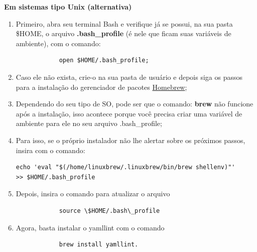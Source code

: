 \textbf{Em sistemas tipo Unix (alternativa)}

\begin{enumerate}
  \item Primeiro, abra seu terminal Bash e verifique já se possui, na sua pasta \$HOME, o arquivo \textbf{.bash\_profile} (é nele que ficam suas variáveis de ambiente), com o comando: 
    \lstset{language=Fortran,
             basicstyle=\ttfamily\small
    }
        \begin{lstlisting}
            open $HOME/.bash_profile; 
        \end{lstlisting}
  
  \item Caso ele não exista, crie-o na sua pasta de usuário e depois siga os passos para a instalação do gerenciador de pacotes \href{https://brew.sh/index_pt-br}{Homebrew};
  
  \item Dependendo do seu tipo de \acs{SO}, pode ser que o comando: \textbf{brew} não funcione após a instalação, isso acontece porque você precisa criar uma variável de ambiente para ele no seu arquivo .bash\_profile;
  
  \item Para isso, se o próprio instalador não lhe alertar sobre os próximos passos, insira com o comando:  
    \lstset{language=Fortran,
                 basicstyle=\ttfamily\small,
                 showstringspaces=false
        }
        \begin{lstlisting} 
echo 'eval "$(/home/linuxbrew/.linuxbrew/bin/brew shellenv)"'
>> $HOME/.bash_profile
        \end{lstlisting}
        
  \item Depois, insira o comando para atualizar o arquivo
    \lstset{language=Fortran,
             basicstyle=\ttfamily\small
    }
        \begin{lstlisting} 
            source \$HOME/.bash\_profile 
        \end{lstlisting}
        
  \item Agora, basta instalar o yamllint com o comando 
    \lstset{language=Fortran,
            basicstyle=\ttfamily\small
        }
        \begin{lstlisting} 
            brew install yamllint. 
        \end{lstlisting}
  
\end{enumerate}

